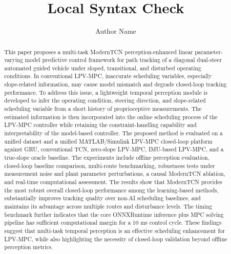 \documentclass[twocolumn]{article}
\begin{document}
\title{Local Syntax Check}
\author{Author Name}
\maketitle





\begin{abstract}

This paper proposes a multi-task ModernTCN perception-enhanced linear parameter-varying model predictive control framework for path tracking of a diagonal dual-steer automated guided vehicle under sloped, transitional, and disturbed operating conditions. In conventional LPV-MPC, inaccurate scheduling variables, especially slope-related information, may cause model mismatch and degrade closed-loop tracking performance. To address this issue, a lightweight temporal perception module is developed to infer the operating condition, steering direction, and slope-related scheduling variable from a short history of proprioceptive measurements. The estimated information is then incorporated into the online scheduling process of the LPV-MPC controller while retaining the constraint-handling capability and interpretability of the model-based controller. The proposed method is evaluated on a unified dataset and a unified MATLAB/Simulink LPV-MPC closed-loop platform against GRU, conventional TCN, zero-slope LPV-MPC, IMU-based LPV-MPC, and a true-slope oracle baseline. The experiments include offline perception evaluation, closed-loop baseline comparison, multi-route benchmarking, robustness tests under measurement noise and plant parameter perturbations, a causal ModernTCN ablation, and real-time computational assessment. The results show that ModernTCN provides the most robust overall closed-loop performance among the learning-based methods, substantially improves tracking quality over non-AI scheduling baselines, and maintains its advantage across multiple routes and disturbance levels. The timing benchmark further indicates that the core ONNXRuntime inference plus MPC solving pipeline has sufficient computational margin for a 10 ms control cycle. These findings suggest that multi-task temporal perception is an effective scheduling enhancement for LPV-MPC, while also highlighting the necessity of closed-loop validation beyond offline perception metrics.

\end{abstract}
\end{document}
